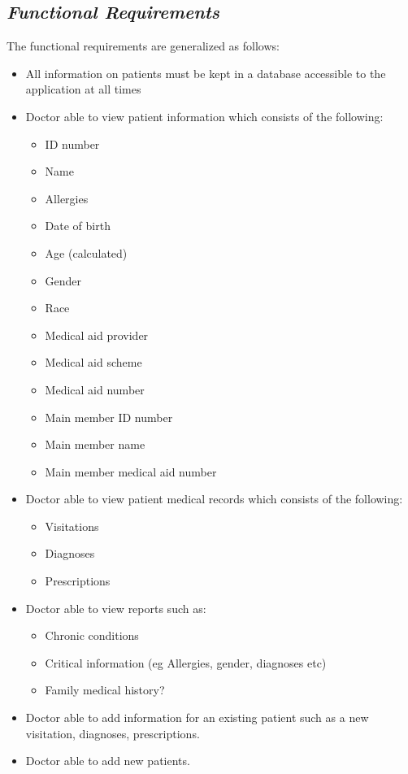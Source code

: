 \documentclass[a4paper]{article}
\begin{document}
\subsection{\textit{Functional Requirements}}
The functional requirements are generalized as follows:
\begin{itemize}
	\item All information on patients must be kept in a database accessible to the application at all times
	\item Doctor able to view patient information which consists of the following:
		\begin{itemize}
			\item ID number
			\item Name
			\item Allergies
			\item Date of birth
			\item Age (calculated)
			\item Gender
			\item Race
			\item Medical aid provider
			\item Medical aid scheme
			\item Medical aid number
			\item Main member ID number
			\item Main member name
			\item Main member medical aid number
		\end{itemize}
	\item Doctor able to view patient medical records which consists of the following:
		\begin{itemize}
			\item Visitations
			\item Diagnoses
			\item Prescriptions
		\end{itemize}
	\item Doctor able to view reports such as:
		\begin{itemize}
			\item Chronic conditions
			\item Critical information (eg Allergies, gender, diagnoses etc)
			\item Family medical history?
		\end{itemize}
	\item Doctor able to add information for an existing patient such as a new visitation, diagnoses, prescriptions.
	\item Doctor able to add new patients.
\end{itemize}
		
\end{document}
